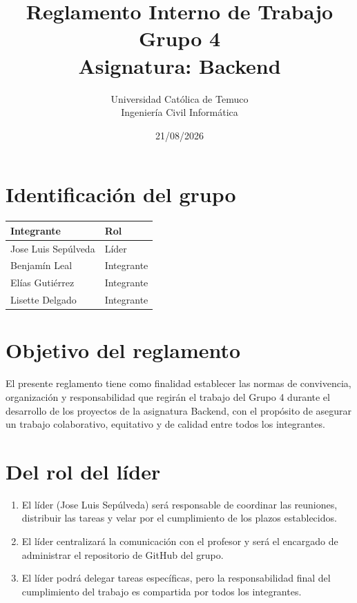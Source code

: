 \documentclass[11pt,a4paper]{article}
\title{\textbf{Reglamento Interno de Trabajo\\ Grupo 4}\\[0.3cm]
\large Asignatura: Backend}
\author{Universidad Cat\'olica de Temuco\\ Ingenier\'ia Civil Inform\'atica}
\date{21/08/2026}
\begin{document}
\maketitle
\thispagestyle{fancy}

\section{Identificaci\'on del grupo}

\begin{center}
\begin{tabular}{|l|l|}
\hline
\textbf{Integrante} & \textbf{Rol} \\
\hline
Jose Luis Sep\'ulveda & L\'ider \\
\hline
Benjam\'in Leal & Integrante \\
\hline
El\'ias Guti\'errez & Integrante \\
\hline
Lisette Delgado & Integrante \\
\hline
\end{tabular}
\end{center}

\section{Objetivo del reglamento}

El presente reglamento tiene como finalidad establecer las normas de convivencia, organizaci\'on y responsabilidad que regir\'an el trabajo del Grupo 4 durante el desarrollo de los proyectos de la asignatura Backend, con el prop\'osito de asegurar un trabajo colaborativo, equitativo y de calidad entre todos los integrantes.

\section{Del rol del l\'ider}

\begin{enumerate}[label=\alph*)]
    \item El l\'ider (Jose Luis Sep\'ulveda) ser\'a responsable de coordinar las reuniones, distribuir las tareas y velar por el cumplimiento de los plazos establecidos.
    \item El l\'ider centralizar\'a la comunicaci\'on con el profesor y ser\'a el encargado de administrar el repositorio de GitHub del grupo.
    \item El l\'ider podr\'a delegar tareas espec\'ificas, pero la responsabilidad final del cumplimiento del trabajo es compartida por todos los integrantes.
\end{enumerate}
\end{document}
